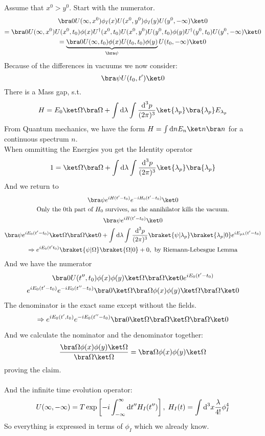 \documentclass[]{scrartcl}
\begin{document}
Assume that $x^0 > y^0$. Start with the numerator.
\begin{gather}
	\bra 0 U(\infty, x^0) \phi_I(x) U(x^0, y^0) \phi_I(y) U(y^0, -\infty)\ket0\\
	= \bra 0 U(\infty, x^0) U(x^0, t_0) \phi(x) U^\dagger(x^0, t_0) U(x^0, y^0) U(y^0, t_0) \phi(y) U^\dagger(y^0,t_0)U(y^0,-\infty)\ket0\\
	= \underbrace{\bra0 U(\infty, t_0)\phi(x)U(t_0, t_0)\phi(y)}_{\bra\psi}U(t_0, -\infty)\ket0
\end{gather}
Because of the differences in vacuums we now consider:
$$	
\bra\psi U(t_0, t')\ket0
$$
There is a Mass gap, s.t. 
$$
H = E_0 \ket\Omega\bra\Omega + \int \text d\lambda\int \frac{\text d^3p}{(2\pi)^3}\ket{\lambda_p}\bra{\lambda_p}E_{\lambda_p}
$$
From Quantum mechanics, we have the form $H = \int \text dn E_n\ket n \bra n$ for a continuous spectrum $n$.\\
When ommitting the Energies you get the Identity operator
$$
1 = \ket\Omega\bra\Omega + \int \text d\lambda\int\frac{\text d^3p}{(2\pi)^3}\ket{\lambda_p}\bra{\lambda_p}
$$
And we return to
\begin{gather}
	\bra\psi e^{iH(t'-t_0)}e^{-iH_0(t'-t_0)}\ket0\\
	\text{Only the 0th part of $H_0$ survives, as the annihilator kills the vacuum.}\nonumber\\
	\bra\psi e^{iH(t'-t_0)}\ket0\\
	\bra\psi e^{iE_0(t'-t_0)}\ket\Omega\bra\Omega\ket0 + \int\text d\lambda \int\frac{\text d^3p}{(2\pi)^3}\braket{\psi|\lambda_p}\braket{\lambda_p|0}e^{iE_{p\lambda}(t'-t_0)}\\
	\Rightarrow e^{iE_0(t't_0)} \braket{\psi|\Omega}\braket{\Omega|0} + 0, \text{ by Riemann-Lebesgue Lemma}
\end{gather}
And we have the numerator
\begin{gather}
\bra 0 U(t'', t_0) \phi(x)\phi(y)\ket\Omega\bra\Omega\ket0 e^{iE_0(t'-t_0)}\\
e^{iE_0(t'-t_0)}e^{-iE_0(t''-t_0)}\bra0\ket\Omega\bra\Omega\phi(x)\phi(y)\ket\Omega\bra\Omega\ket0
\end{gather}
The denominator is the exact same except without the fields.
\begin{equation}
	\Rightarrow e^{iE_0(t',t_0)}e^{-iE_0(t''-t_0)}\bra0\ket\Omega\bra\Omega\ket\Omega\bra\Omega\ket0
\end{equation}

And we calculate the nominator and the denominator together:
\begin{equation}
	\frac{\bra\Omega\phi(x)\phi(y)\ket\Omega}{\bra\Omega\ket\Omega} = \bra\Omega\phi(x)\phi(y)\ket\Omega
\end{equation}
proving the claim.\\\\
And the infinite time evolution operator:
\begin{gather}
	U(\infty,-\infty) = T\exp\left[-i\int_{-\infty}^\infty \text dt''H_I(t'')\right],\; H_I(t)=\int\text d^3x \frac{\lambda}{4!}\phi_I^4
\end{gather}
So everything is expressed in terms of $\phi_I$ which we already know.
\end{document}
